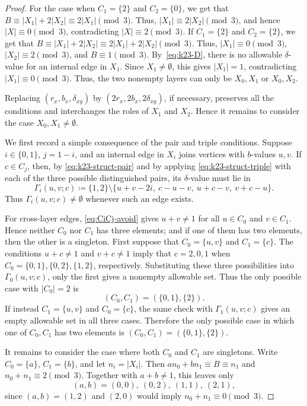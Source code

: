 ﻿\documentclass[11pt]{article}
\numberwithin{equation}{section}
\theoremstyle{remark}
\begin{document}
\begin{proof}
    For the case when $C_1=\{2\}$ and \(C_2=\{0\}\),
    we get that $B\equiv |X_1|+2|X_2|\equiv2|X_1|\pmod3$.
    Thus, $|X_1|\equiv2|X_2|\pmod3$, and hence $|X|\equiv0\pmod3$, contradicting $|X|\equiv2\pmod3$.
    If $C_1=\{2\}$ and \(C_2=\{2\}\), we get that $B\equiv |X_1|+2|X_2|\equiv2|X_1|+2|X_2|\pmod3$.
    Thus, $|X_1|\equiv0\pmod3$, $|X_2|\equiv2\pmod3$, and $B\equiv1\pmod3$.
    By~\eqref{eq:k23-D}, there is no allowable $\delta$-value for an internal edge in $X_1$. Since $X_1\ne\emptyset$, this gives $|X_1|=1$, contradicting $|X_1|\equiv0\pmod3$.
    Thus, the two nonempty layers can only be $X_0, X_1$ or $X_0, X_2.$

    Replacing \((r_x,b_x,\delta_{xy})\) by
    \((2r_x,2b_x,2\delta_{xy})\), if necessary, preserves all the conditions
    and interchanges the roles of \(X_1\) and \(X_2\). Hence it remains to
    consider the case \(X_0,X_1\ne\emptyset\).

    We first record a simple consequence of the pair and triple conditions.
    Suppose \(i\in\{0,1\}\), \(j=1-i\), and an internal edge in \(X_i\) joins
    vertices with \(b\)-values \(u,v\). If \(c\in C_j\), then, by
    \eqref{eq:k23-struct-pair} and by applying \eqref{eq:k23-struct-triple}
    with each of the three possible distinguished pairs, its \(\delta\)-value
    must lie in
    \[
        \Gamma_i(u,v;c)
        \coloneqq
        \{1,2\}\setminus
        \{u+v-2i,\ c-u-v,\ u+c-v,\ v+c-u\}.
    \]
    Thus \(\Gamma_i(u,v;c)\ne\emptyset\) whenever such an edge exists.

    For cross-layer edges, \eqref{eq:CiCj-avoid} gives $u+v\ne1$ for all $u\in C_0$ and $v\in C_1$.
    Hence neither \(C_0\) nor \(C_1\) has three elements; and if one of them
    has two elements, then the other is a singleton.
    First suppose that \(C_0=\{u,v\}\) and \(C_1=\{c\}\).
    The conditions \(u+c\ne1\) and \(v+c\ne1\) imply that
    \(c=2,0,1\) when \(C_0=\{0,1\},\{0,2\},\{1,2\}\), respectively.
    Substituting these three possibilities into \(\Gamma_0(u,v;c)\), only the first gives a nonempty allowable set.
    Thus the only possible case with \(|C_0|=2\) is
    \[
        (C_0,C_1)=(\{0,1\},\{2\}).
    \]
    If instead \(C_1=\{u,v\}\) and \(C_0=\{c\}\), the same check with \(\Gamma_1(u,v;c)\) gives an empty allowable set in all three cases.
    Therefore the only possible case in which one of \(C_0,C_1\) has two
    elements is $(C_0,C_1)=(\{0,1\},\{2\})$.

    It remains to consider the case where both \(C_0\) and \(C_1\) are
    singletons.  Write \(C_0=\{a\}\), \(C_1=\{b\}\), and let
    \(n_i=|X_i|\).  Then $an_0+bn_1\equiv B\equiv n_1$ and $n_0+n_1\equiv2\pmod3$.
    Together with \(a+b\ne1\), this leaves only
    \[
        (a,b)=(0,0),\ (0,2),\ (1,1),\ (2,1),
    \]
    since \((a,b)=(1,2)\) and \((2,0)\) would imply
    \(n_0+n_1\equiv0\pmod3\).


\end{proof}
\end{document}

